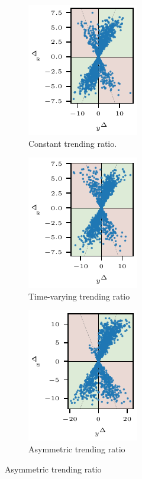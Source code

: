 \documentclass[pdflatex]{sn-jnl}
\theoremstyle{plain}%
\theoremstyle{definition}
\begin{document}
\begin{figure}
    \centering
    \begin{subfigure}{0.24\textwidth}
        \includegraphics{plots/illustrative_examples/appendix_4q_dgp1}
        \caption{Constant trending ratio.}
    \end{subfigure}\hspace{0.01\textwidth}
    \begin{subfigure}{0.24\textwidth}
        \includegraphics{plots/illustrative_examples/appendix_4q_dgp1_time}
        \caption{Time-varying trending ratio}
    \end{subfigure}\hspace{0.01\textwidth}
    \begin{subfigure}{0.24\textwidth}
        \includegraphics{plots/illustrative_examples/appendix_4q_dgp1_asym}
        \caption{Asymmetric trending ratio}

\end{subfigure}
\end{figure}
\end{document}
